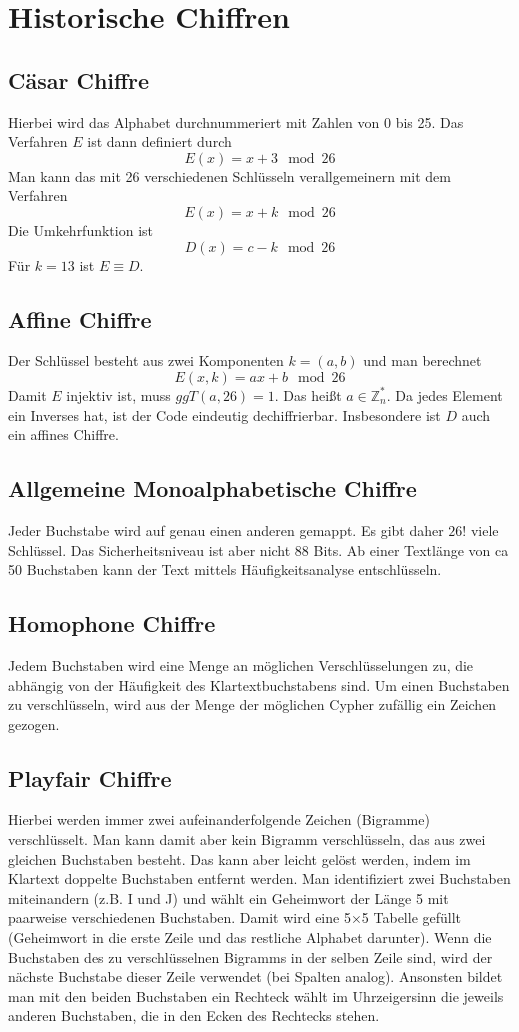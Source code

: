 \documentclass[a4paper, 12pt]{article}
\theoremstyle{plain}
\theoremstyle{definition}
\theoremstyle{lemma}
\theoremstyle{remark}
\theoremstyle{corollary}
\theoremstyle{example}
\begin{document}
	\section{Historische Chiffren}
	\subsection{Cäsar Chiffre}
	Hierbei wird das Alphabet durchnummeriert mit Zahlen von 0 bis 25. Das Verfahren $E$ ist dann definiert durch \[E(x) = x+3 \mod 26\]
	Man kann das mit 26 verschiedenen Schlüsseln verallgemeinern mit dem Verfahren \[E(x) = x+k \mod 26\]
	Die Umkehrfunktion ist \[D(x) = c-k \mod 26\]
	Für $k=13$ ist $E\equiv D$.
	\subsection{Affine Chiffre}
	Der Schlüssel besteht aus zwei Komponenten $k = (a,b)$ und man berechnet \[E(x,k) = ax+b \mod 26\]
	Damit $E$ injektiv ist, muss $ggT(a,26) = 1$. Das heißt $a \in \mathbb{Z}_n^*$. Da jedes Element ein Inverses hat, ist der Code eindeutig dechiffrierbar. Insbesondere ist $D$ auch ein affines Chiffre.
	\subsection{Allgemeine Monoalphabetische Chiffre}
	Jeder Buchstabe wird auf genau einen anderen gemappt. Es gibt daher $26!$ viele Schlüssel. Das Sicherheitsniveau ist aber nicht 88 Bits. Ab einer Textlänge von ca 50 Buchstaben kann der Text mittels Häufigkeitsanalyse entschlüsseln.
	\subsection{Homophone Chiffre}
	Jedem Buchstaben wird eine Menge an möglichen Verschlüsselungen zu, die abhängig von der Häufigkeit des Klartextbuchstabens sind. Um einen Buchstaben zu verschlüsseln, wird aus der Menge der möglichen Cypher zufällig ein Zeichen gezogen.
	\subsection{Playfair Chiffre}
	Hierbei werden immer zwei aufeinanderfolgende Zeichen (Bigramme) verschlüsselt. Man kann damit aber kein Bigramm verschlüsseln, das aus zwei gleichen Buchstaben besteht. Das kann aber leicht gelöst werden, indem im Klartext doppelte Buchstaben entfernt werden. Man identifiziert zwei Buchstaben miteinandern (z.B. I und J) und wählt ein Geheimwort der Länge 5 mit paarweise verschiedenen Buchstaben. Damit wird eine 5$\times$5 Tabelle gefüllt (Geheimwort in die erste Zeile und das restliche Alphabet darunter). Wenn die Buchstaben des zu verschlüsselnen Bigramms in der selben Zeile sind, wird der nächste Buchstabe dieser Zeile verwendet (bei Spalten analog). Ansonsten bildet man mit den beiden Buchstaben ein Rechteck wählt im Uhrzeigersinn die jeweils anderen Buchstaben, die in den Ecken des Rechtecks stehen.
\end{document}
